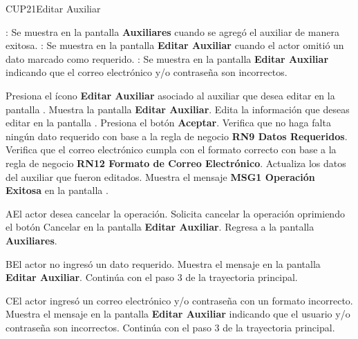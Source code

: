 \begin{UseCase}{CUP21}{Editar Auxiliar}
{\begin{UClist}
	    \UCli {}: Se muestra en la pantalla \textbf{Auxiliares} cuando se agregó el auxiliar de manera exitosa.
	    \UCli {}: Se muestra en la pantalla \textbf{Editar Auxiliar} cuando el actor omitió un dato marcado como requerido.
	    \UCli {}: Se muestra en la pantalla \textbf{Editar Auxiliar} indicando que el correo electrónico y/o contraseña son incorrectos.
		
	    \end{UClist}
	}
 \end{UseCase}

 \begin{UCtrayectoria}
 	
 	\UCpaso [\UCactor] Presiona el ícono \textbf{Editar Auxiliar} asociado al auxiliar que desea editar en la pantalla .
 	\UCpaso Muestra la pantalla \textbf{Editar Auxiliar}.
 	\UCpaso [\UCactor] Edita la información que deseas editar en la pantalla .
 	\UCpaso [\UCactor] Presiona el botón \textbf{Aceptar}.
 	\UCpaso Verifica que no haga falta ningún dato requerido con base a la regla de negocio \textbf{RN9 Datos Requeridos}.
 	\UCpaso Verifica que el correo electrónico cumpla con el formato correcto con base a la regla de negocio \textbf{RN12 Formato de Correo Electrónico}.
 	\UCpaso Actualiza los datos del auxiliar que fueron editados.
 	\UCpaso Muestra el mensaje \textbf{MSG1 Operación Exitosa} en la pantalla .
 	   
 \end{UCtrayectoria}

 \begin{UCtrayectoriaA}{A}{El actor desea cancelar la operación.}
	\UCpaso[\UCactor] Solicita cancelar la operación oprimiendo el botón Cancelar en la pantalla \textbf{Editar Auxiliar}.
	\UCpaso Regresa a la pantalla \textbf{Auxiliares}.
\end{UCtrayectoriaA}

\begin{UCtrayectoriaA}{B}{El actor no ingresó un dato requerido.}
	\UCpaso Muestra el mensaje  en la pantalla \textbf{Editar Auxiliar}.
	\UCpaso Continúa con el paso 3 de la trayectoria principal.
\end{UCtrayectoriaA}

\begin{UCtrayectoriaA}{C}{El actor ingresó un correo electrónico y/o contraseña con un formato incorrecto.}
	\UCpaso Muestra el mensaje  en la pantalla \textbf{Editar Auxiliar} indicando que el usuario y/o contraseña son incorrectos.
	\UCpaso Continúa con el paso 3 de la trayectoria principal.
\end{UCtrayectoriaA} 

